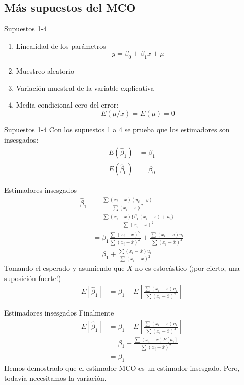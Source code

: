 \subsection{Más supuestos del MCO}
\begin{frame}{Supuestos 1-4}
	\begin{enumerate}
		\item Linealidad de los parámetros
		$$y=\beta_{0}+\beta_{1}x+\mu$$
		\item Muestreo aleatorio
		\item Variación muestral de la variable explicativa
		\item Media condicional cero del error:
		$$E(\mu / x) = E(\mu) = 0$$
	\end{enumerate}
\end{frame}
\begin{frame}{Supuestos 1-4}
	Con los supuestos 1 a 4 se prueba que los estimadores son insesgados:
	\begin{align*}
		E(\hat{\beta}_{1}) &= \beta_{1}\\
		E(\hat{\beta}_{0}) &= \beta_{0}
	\end{align*}
\end{frame}
\begin{frame}{Estimadores insesgados}
		\begin{align*}
			\widehat{\beta}_1 &= \frac{\sum (x_{i}-\overline{x})(y_{i}-\overline{y})}{\sum (x_{i}-\overline{x})^2}\\
			& = \frac{\sum (x_{i}-\overline{x})\{\beta_1(x_{i}-\overline{x})+u_i\}}{\sum (x_{i}-\overline{x})^2}\\
			& = \beta_1\frac{\sum (x_{i}-\overline{x})^2}{\sum (x_{i}-\overline{x})^2} + \frac{\sum (x_{i}-\overline{x})u_i}{\sum (x_{i}-\overline{x})^2}\\
			& = \beta_1 + \frac{\sum (x_{i}-\overline{x})u_i}{\sum (x_{i}-\overline{x})^2} \tag{2}
		\end{align*}
	Tomando el esperado y asumiendo que $X$ no es estocástico (¡por cierto, una suposición fuerte!)
		\begin{align*}
			E[\widehat{\beta}_1] & = \beta_1 + E\left[\frac{\sum (x_{i}-\overline{x})u_i}{\sum (x_{i}-\overline{x})^2} \right]
		\end{align*}
\end{frame}
\begin{frame}{Estimadores insesgados}
	Finalmente
		\begin{align*}
			E[\widehat{\beta}_1] & = \beta_1 + E\left[\frac{\sum (x_{i}-\overline{x})u_i}{\sum (x_{i}-\overline{x})^2}\right]\\
								 & = \beta_1 + \frac{\sum (x_{i}-\overline{x})E[u_i]}{\sum (x_{i}-\overline{x})^2}\\
								 & = \beta_1
		\end{align*}
	Hemos demostrado que el estimador MCO es un estimador insesgado. Pero, todavía necesitamos la variación.
\end{frame}
